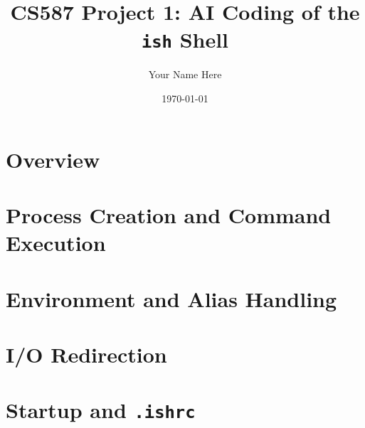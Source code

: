 \documentclass[11pt]{article}
\title{CS587 Project 1: AI Coding of the \texttt{ish} Shell}
\author{Your Name Here}
\date{\today}
\begin{document}
\maketitle


\section{Overview}

\section{Process Creation and Command Execution}

\section{Environment and Alias Handling}

\section{I/O Redirection}

\section{Startup and \texttt{.ishrc}}
\end{document}
